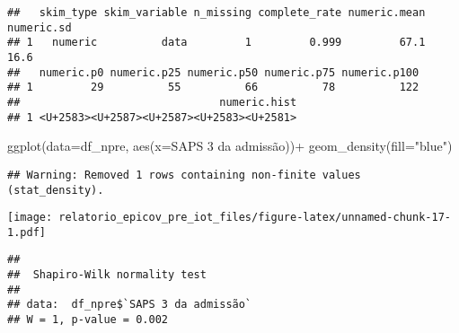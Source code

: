 \documentclass[
]{article}
\newenvironment{Shaded}{\begin{snugshade}}{\end{snugshade}}
\newcommand{\AttributeTok}[1]{\textcolor[rgb]{0.77,0.63,0.00}{#1}}
\newcommand{\FunctionTok}[1]{\textcolor[rgb]{0.00,0.00,0.00}{#1}}
\newcommand{\NormalTok}[1]{#1}
\newcommand{\SpecialCharTok}[1]{\textcolor[rgb]{0.00,0.00,0.00}{#1}}
\newcommand{\StringTok}[1]{\textcolor[rgb]{0.31,0.60,0.02}{#1}}
\begin{document}
\begin{Shaded}
\end{Shaded}

\begin{verbatim}
##   skim_type skim_variable n_missing complete_rate numeric.mean numeric.sd
## 1   numeric          data         1         0.999         67.1       16.6
##   numeric.p0 numeric.p25 numeric.p50 numeric.p75 numeric.p100
## 1         29          55          66          78          122
##                               numeric.hist
## 1 <U+2583><U+2587><U+2587><U+2583><U+2581>
\end{verbatim}

\begin{Shaded}
\begin{Highlighting}[]
\FunctionTok{ggplot}\NormalTok{(}\AttributeTok{data=}\NormalTok{df\_npre, }\FunctionTok{aes}\NormalTok{(}\AttributeTok{x=}\StringTok{\textasciigrave{}}\AttributeTok{SAPS 3 da admissão}\StringTok{\textasciigrave{}}\NormalTok{))}\SpecialCharTok{+}
  \FunctionTok{geom\_density}\NormalTok{(}\AttributeTok{fill=}\StringTok{"blue"}\NormalTok{)}
\end{Highlighting}
\end{Shaded}

\begin{verbatim}
## Warning: Removed 1 rows containing non-finite values (stat_density).
\end{verbatim}

\texttt{[image: relatorio\_epicov\_pre\_iot\_files/figure-latex/unnamed-chunk-17-1.pdf]}

\begin{Shaded}
\end{Shaded}

\begin{verbatim}
## 
##  Shapiro-Wilk normality test
## 
## data:  df_npre$`SAPS 3 da admissão`
## W = 1, p-value = 0.002
\end{verbatim}
\end{document}
